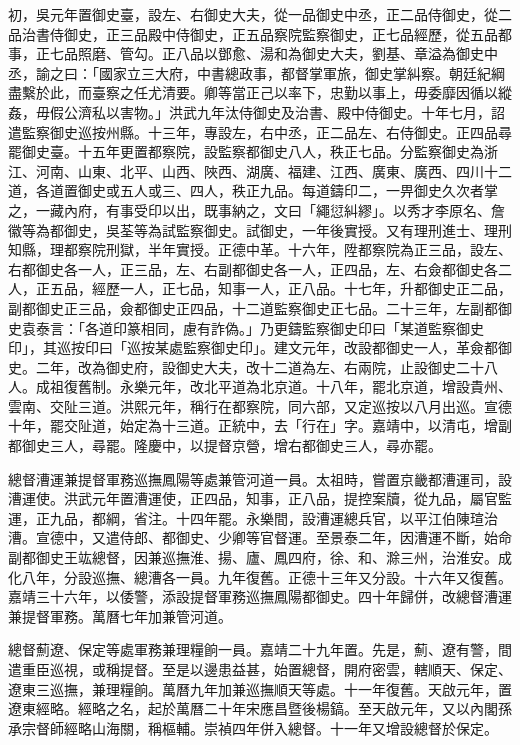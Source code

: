 初，吳元年置御史臺，設左、右御史大夫，從一品御史中丞，正二品侍御史，從二品治書侍御史，正三品殿中侍御史，正五品察院監察御史，正七品經歷，從五品都事，正七品照磨、管勾。正八品以鄧愈、湯和為御史大夫，劉基、章溢為御史中丞，諭之曰：「國家立三大府，中書總政事，都督掌軍旅，御史掌糾察。朝廷紀綱盡繫於此，而臺察之任尤清要。卿等當正己以率下，忠勤以事上，毋委靡因循以縱姦，毋假公濟私以害物。」洪武九年汰侍御史及治書、殿中侍御史。十年七月，詔遣監察御史巡按州縣。十三年，專設左，右中丞，正二品左、右侍御史。正四品尋罷御史臺。十五年更置都察院，設監察都御史八人，秩正七品。分監察御史為浙江、河南、山東、北平、山西、陜西、湖廣、福建、江西、廣東、廣西、四川十二道，各道置御史或五人或三、四人，秩正九品。每道鑄印二，一畀御史久次者掌之，一藏內府，有事受印以出，既事納之，文曰「繩愆糾繆」。以秀才李原名、詹徽等為都御史，吳荃等為試監察御史。試御史，一年後實授。又有理刑進士、理刑知縣，理都察院刑獄，半年實授。正德中革。十六年，陞都察院為正三品，設左、右都御史各一人，正三品，左、右副都御史各一人，正四品，左、右僉都御史各二人，正五品，經歷一人，正七品，知事一人，正八品。十七年，升都御史正二品，副都御史正三品，僉都御史正四品，十二道監察御史正七品。二十三年，左副都御史袁泰言：「各道印篆相同，慮有詐偽。」乃更鑄監察御史印曰「某道監察御史印」，其巡按印曰「巡按某處監察御史印」。建文元年，改設都御史一人，革僉都御史。二年，改為御史府，設御史大夫，改十二道為左、右兩院，止設御史二十八人。成祖復舊制。永樂元年，改北平道為北京道。十八年，罷北京道，增設貴州、雲南、交阯三道。洪熙元年，稱行在都察院，同六部，又定巡按以八月出巡。宣德十年，罷交阯道，始定為十三道。正統中，去「行在」字。嘉靖中，以清屯，增副都御史三人，尋罷。隆慶中，以提督京營，增右都御史三人，尋亦罷。

總督漕運兼提督軍務巡撫鳳陽等處兼管河道一員。太祖時，嘗置京畿都漕運司，設漕運使。洪武元年置漕運使，正四品，知事，正八品，提控案牘，從九品，屬官監運，正九品，都綱，省注。十四年罷。永樂間，設漕運總兵官，以平江伯陳瑄治漕。宣德中，又遣侍郎、都御史、少卿等官督運。至景泰二年，因漕運不斷，始命副都御史王竑總督，因兼巡撫淮、揚、廬、鳳四府，徐、和、滁三州，治淮安。成化八年，分設巡撫、總漕各一員。九年復舊。正德十三年又分設。十六年又復舊。嘉靖三十六年，以倭警，添設提督軍務巡撫鳳陽都御史。四十年歸併，改總督漕運兼提督軍務。萬曆七年加兼管河道。

總督薊遼、保定等處軍務兼理糧餉一員。嘉靖二十九年置。先是，薊、遼有警，間遣重臣巡視，或稱提督。至是以邊患益甚，始置總督，開府密雲，轄順天、保定、遼東三巡撫，兼理糧餉。萬曆九年加兼巡撫順天等處。十一年復舊。天啟元年，置遼東經略。經略之名，起於萬曆二十年宋應昌暨後楊鎬。至天啟元年，又以內閣孫承宗督師經略山海關，稱樞輔。崇禎四年併入總督。十一年又增設總督於保定。

